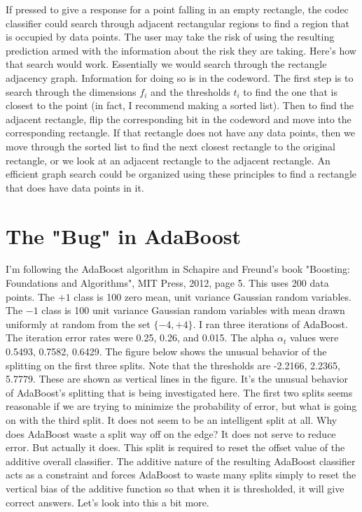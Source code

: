 \documentclass{article}
\begin{document}
If pressed to give a response for a point falling in an empty rectangle, the codec classifier could search through adjacent rectangular regions to find a region that is occupied by data points.  The user may take the risk of using the resulting prediction armed with the information about the risk they are taking.  Here's how that search would work.  Essentially we would search through the rectangle adjacency graph.  Information for doing so is in the codeword.  The first step is to search through the dimensions $f_i$ and the thresholds $t_i$ to find the one that is closest to the point (in fact, I recommend making a sorted list).  Then to find the adjacent rectangle, flip the corresponding bit in the codeword and move into the corresponding rectangle.  If that rectangle does not have any data points, then we move through the sorted list to find the next closest rectangle to the original rectangle, or we look at an adjacent rectangle to the adjacent rectangle.  An efficient graph search could be organized using these principles to find a rectangle that does have data points in it.

\section{The "Bug" in AdaBoost}

I'm following the AdaBoost algorithm in Schapire and Freund's book "Boosting: Foundations and Algorithms", MIT Press, 2012, page 5.  This uses 200 data points.  The $+1$ class is 100 zero mean, unit variance Gaussian random variables.  The $-1$ class is 100 unit variance Gaussian random variables with mean drawn uniformly at random from the set $\{ -4, +4\}$.  I ran three iterations of AdaBoost.  The iteration error rates were 0.25, 0.26, and 0.015.  The alpha $\alpha_t$ values were 0.5493, 0.7582, 0.6429.  The figure below shows the unusual behavior of the splitting on the first three splits.  Note that the thresholds are -2.2166, 2.2365, 5.7779.  These are shown as vertical lines in the figure.  It's the unusual behavior of AdaBoost's splitting that is being investigated here.  The first two splits seems reasonable if we are trying to minimize the probability of error, but what is going on with the third split.  It does not seem to be an intelligent split at all.  Why does AdaBoost waste a split way off on the edge?  It does not serve to reduce error.  But actually it does.  This split is required to reset the offset value of the additive overall classifier.  The additive nature of the resulting AdaBoost classifier acts as a constraint and forces AdaBoost to waste many splits simply to reset the vertical bias of the additive function so that when it is thresholded, it will give correct answers.  Let's look into this a bit more.
\end{document}
